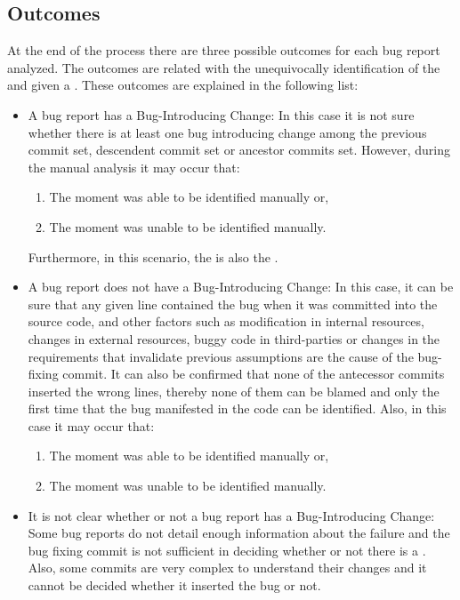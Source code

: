 \documentclass[a4paper, 12pt]{book}
\begin{document}
\subsection{Outcomes}

At the end of the process there are three possible outcomes for each bug report analyzed. The outcomes are related with the unequivocally identification of the \BIC and \FFC given a \BFC.
These outcomes are explained in the following list:  %

\begin{itemize}
	\item A bug report has a Bug-Introducing Change: In this case it is not sure whether there is at least one bug introducing change among the previous commit set, descendent commit set or ancestor commits set. However, during the manual analysis it may occur that:
		\begin{enumerate}
			\item The moment was able to be identified manually or,
			\item The moment was unable to be identified manually. 
		\end{enumerate}
		Furthermore, in this scenario, the \BIC is also the \FFC.
	\item A bug report does not have a Bug-Introducing Change: In this case, it can be sure that any given line contained the bug when it was committed into the source code, and other factors such as modification in internal resources, changes in external resources, buggy code in third-parties or changes in the requirements that invalidate previous assumptions are the cause of the bug-fixing commit. It can also be confirmed that none of the antecessor commits inserted the wrong lines, thereby none of them can be blamed and only the first time that the bug manifested in the code can be identified. Also, in this case it may occur that:
	\begin{enumerate}
			\item The moment was able to be identified manually or,
			\item The moment was unable to be identified manually. 		\end{enumerate}
	\item It is not clear whether or not a bug report has a Bug-Introducing Change: Some bug reports do not detail enough information about the failure and the bug fixing commit is not sufficient in deciding whether or not there is a \BIC. Also, some commits are very complex to understand their changes and it cannot be decided whether it inserted the bug or not.

\end{itemize}
\end{document}
